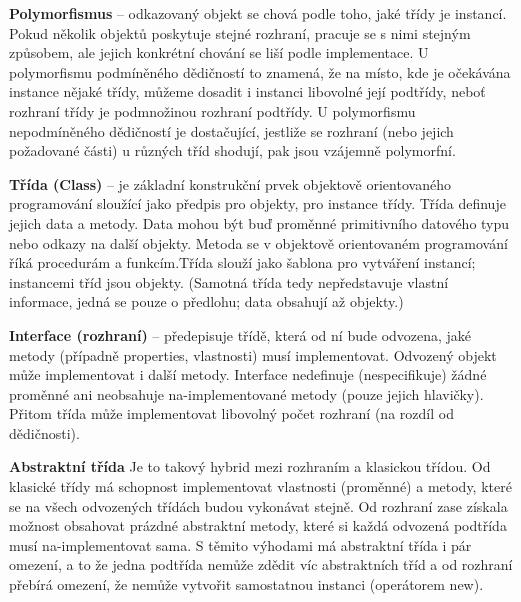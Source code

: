 \textbf{Polymorfismus} -- odkazovaný objekt se chová podle toho, jaké třídy je instancí. Pokud několik objektů poskytuje stejné rozhraní, pracuje se s nimi stejným způsobem, ale jejich konkrétní chování se liší podle implementace. U polymorfismu podmíněného dědičností to znamená, že na místo, kde je očekávána instance nějaké třídy, můžeme dosadit i instanci libovolné její podtřídy, neboť rozhraní třídy je podmnožinou rozhraní podtřídy. U polymorfismu nepodmíněného dědičností je dostačující, jestliže se rozhraní (nebo jejich požadované části) u různých tříd shodují, pak jsou vzájemně polymorfní.

\textbf{Třída (Class)} -- je základní konstrukční prvek objektově orientovaného programování sloužící jako předpis pro objekty, pro instance třídy. Třída definuje jejich data a metody. Data mohou být buď proměnné primitivního datového typu nebo odkazy na další objekty. Metoda se v objektově orientovaném programování říká procedurám a funkcím.Třída slouží jako šablona pro vytváření instancí; instancemi tříd jsou objekty. (Samotná třída tedy nepředstavuje vlastní informace, jedná se pouze o předlohu; data obsahují až objekty.)
 
\textbf{Interface (rozhraní)} -- předepisuje třídě, která od ní bude odvozena, jaké metody (případně properties, vlastnosti) musí implementovat. Odvozený objekt může implementovat i další metody. Interface nedefinuje (nespecifikuje) žádné proměnné ani neobsahuje na-implementované metody (pouze jejich hlavičky). Přitom třída může implementovat libovolný počet rozhraní (na rozdíl od dědičnosti).

\textbf{Abstraktní třída}
Je to takový hybrid mezi rozhraním a klasickou třídou. Od klasické třídy má schopnost implementovat vlastnosti (proměnné) a metody, které se na všech odvozených třídách budou vykonávat stejně. Od rozhraní zase získala možnost obsahovat prázdné abstraktní metody, které si každá odvozená podtřída musí na-implementovat sama. S těmito výhodami má abstraktní třída i pár omezení, a to že jedna podtřída nemůže zdědit víc abstraktních tříd a od rozhraní přebírá omezení, že nemůže vytvořit samostatnou instanci (operátorem new).


